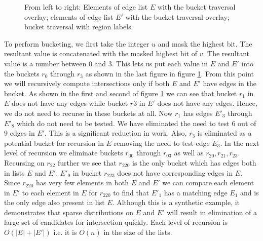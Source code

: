 \begin{figure}
\caption{\label{fig_radix_bucketing}From left to right: Elements of edge list $E$ with the bucket traversal overlay; elements of edge list $E'$ with the bucket traversal overlay; bucket traversal with region labels.}
\end{figure}

To perform bucketing, we first take the integer $u$ and mask the highest bit. The resultant value is concatenated with the masked highest bit of $v$. The resultant value is a number between 0 and 3. This lets us put each value in $E$ and $E'$ into the buckets $r_0$ through $r_3$ as shown in the last figure in figure \ref{fig_radix_bucketing}. From this point we will recursively compute intersections only if both $E$ and $E'$ have edges in the bucket. As shown in the first and second of figure \ref{fig_radix_bucketing} we can see that bucket $r_1$ in $E$ does not have any edges while bucket $r3$ in $E'$ does not have any edges. Hence, we do not need to recurse in these buckets at all. Now $r_1$ has edges $E'_3$ through $E'_8$ which do not need to be tested. We have eliminated the need to test 6 out of 9 edges in $E'$. This is a significant reduction in work. Also, $r_3$ is eliminated as a potential bucket for recursion in $E$ removing the need to test edge $E_3$. In the next level of recursion we eliminate buckets $r_{00}$ through $r_{03}$ as well as $r_{20}, r_{21}, r_{23}$. Recursing on $r_{22}$ further we see that $r_{220}$ is the only bucket which has edges both in lists $E$ and $E'$. $E'_9$ in bucket $r_{223}$ does not have corresponding edges in $E$. Since $r_{220}$ has very few elements in both $E$ and $E'$ we can compare each element in $E'$ to each element in $E$ for $r_{220}$ to find that $E'_1$ has a matching edge $E_1$ and is the only edge also present in list $E$.
Although this is a synthetic example, it demonstrates that sparse distributions on $E$ and $E'$ will result in elimination of a large set of candidates for intersection quickly. Each level of recursion is $O(|E|+|E'|)$ i.e. it is $O(n)$ in the size of the lists.

